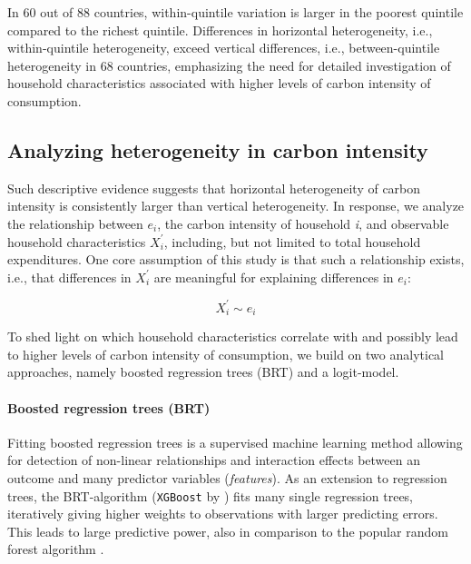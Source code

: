 \documentclass[12pt, a4paper]{article}
\begin{document}
In 60 out of 88 countries, within-quintile variation  is larger in the poorest quintile compared to the richest quintile. Differences in horizontal heterogeneity, i.e., within-quintile heterogeneity, exceed vertical differences, i.e., between-quintile heterogeneity in 68 countries, emphasizing the need for detailed investigation of household characteristics associated with higher levels of carbon intensity of consumption.

\subsection{Analyzing heterogeneity in carbon intensity} \label{sec:methods}

Such descriptive evidence suggests that horizontal heterogeneity of carbon intensity is consistently larger than vertical heterogeneity. In response, we analyze the relationship between $e_{i}$, the carbon intensity of household \textit{i}, and observable household characteristics $X_{i}^{'}$, including, but not limited to total household expenditures. One core assumption of this study is that such a relationship exists, i.e., that differences in $X_{i}^{'}$ are meaningful for explaining differences in $e_{i}$:

\begin{equation} \label{eq:relationship}
    X_{i}^{'} \sim e_{i} 
\end{equation}


To shed light on which household characteristics correlate with and possibly lead to higher levels of carbon intensity of consumption, we build on two analytical approaches, namely boosted regression trees (BRT) and a logit-model.

\paragraph{Boosted regression trees (BRT)} Fitting boosted regression trees \autocite{Friedman.2003, Elith.2008} is a supervised machine learning method allowing for detection of non-linear relationships and interaction effects between an outcome and many predictor variables (\textit{features}). As an extension to regression trees, the BRT-algorithm (\texttt{XGBoost} by \textcite{Chen.2016}) fits many single regression trees, iteratively giving higher weights to observations with larger predicting errors. This leads to large predictive power, also in comparison to the popular random forest algorithm \autocite[e.g.,][]{Bentejac.2021}.
\end{document}
